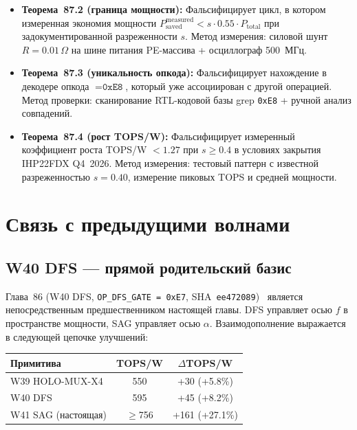 \begin{itemize}
  \item \textbf{Теорема~87.2 (граница мощности):}
        Фальсифицирует цикл, в котором измеренная экономия мощности
        $P_{\mathrm{saved}}^{\mathrm{measured}} < s \cdot 0{.}55 \cdot
        P_{\mathrm{total}}$ при задокументированной разреженности $s$.
        Метод измерения: силовой шунт $R = 0{.}01\,\Omega$ на шине питания
        PE-массива + осциллограф 500~МГц.

  \item \textbf{Теорема~87.3 (уникальность опкода):}
        Фальсифицирует нахождение в декодере опкода $= \texttt{0xE8}$,
        который уже ассоциирован с другой операцией.
        Метод проверки: сканирование RTL-кодовой базы
        grep \verb|0xE8| + ручной анализ совпадений.

  \item \textbf{Теорема~87.4 (рост TOPS/W):}
        Фальсифицирует измеренный коэффициент роста TOPS/W $< 1{.}27$
        при $s \geq 0{.}4$ в условиях закрытия IHP22FDX Q4~2026.
        Метод измерения: тестовый паттерн с известной разреженностью $s = 0{.}40$,
        измерение пиковых TOPS и средней мощности.
\end{itemize}

\section{Связь с предыдущими волнами}
\label{sec:glava87-prior-waves}

\subsection{W40 DFS — прямой родительский базис}
\label{ssec:glava87-w40-dfs}

Глава~86 (W40 DFS, \texttt{OP\_DFS\_GATE = 0xE7},
SHA~\texttt{ee472089})~\cite{trios895} является непосредственным
предшественником настоящей главы.  DFS управляет осью $f$
в пространстве мощности, SAG управляет осью $\alpha$.
Взаимодополнение выражается в следующей цепочке улучшений:
\begin{center}
\begin{tabular}{lcc}
  \hline
  Примитива & TOPS/W & $\Delta$TOPS/W \\
  \hline
  W39 HOLO-MUX-X4 & 550 & +30 (+5{.}8\%) \\
  W40 DFS & 595 & +45 (+8{.}2\%) \\
  W41 SAG (настоящая) & $\geq$756 & +161 (+27{.}1\%) \\
  \hline
\end{tabular}
\end{center}

